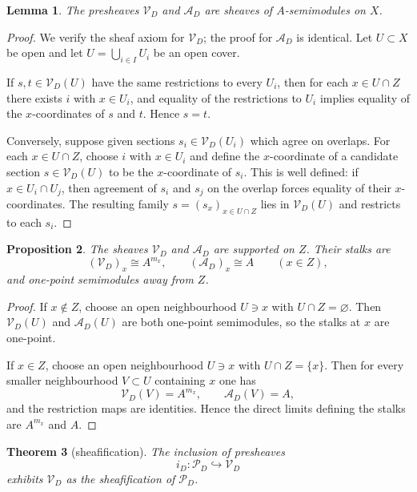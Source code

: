 \documentclass[11pt,a4paper]{article}
\newtheorem{theorem}{Theorem}[section]
\newtheorem{proposition}[theorem]{Proposition}
\newtheorem{lemma}[theorem]{Lemma}
\theoremstyle{definition}
\theoremstyle{remark}
\newcommand{\into}{\hookrightarrow}
\newcommand{\Vd}{\mathcal V_D}
\newcommand{\Ad}{\mathcal A_D}
\newcommand{\Pd}{\mathcal P_D}
\begin{document}
\begin{lemma}\label{lem:product-sheaf}
The presheaves $\Vd$ and $\Ad$ are sheaves of $A$-semimodules on $X$.
\end{lemma}

\begin{proof}
We verify the sheaf axiom for $\Vd$; the proof for $\Ad$ is identical. Let $U\subset X$ be open and let $U=\bigcup_{i\in I}U_i$ be an open cover.

If $s,t\in\Vd(U)$ have the same restrictions to every $U_i$, then for each $x\in U\cap Z$ there exists $i$ with $x\in U_i$, and equality of the restrictions to $U_i$ implies equality of the $x$-coordinates of $s$ and $t$. Hence $s=t$.

Conversely, suppose given sections $s_i\in\Vd(U_i)$ which agree on overlaps. For each $x\in U\cap Z$, choose $i$ with $x\in U_i$ and define the $x$-coordinate of a candidate section $s\in\Vd(U)$ to be the $x$-coordinate of $s_i$. This is well defined: if $x\in U_i\cap U_j$, then agreement of $s_i$ and $s_j$ on the overlap forces equality of their $x$-coordinates. The resulting family $s=(s_x)_{x\in U\cap Z}$ lies in $\Vd(U)$ and restricts to each $s_i$.
\end{proof}

\begin{proposition}\label{prop:stalks-VA}
The sheaves $\Vd$ and $\Ad$ are supported on $Z$. Their stalks are
\[
(\Vd)_x\cong A^{m_x},\qquad (\Ad)_x\cong A\qquad (x\in Z),
\]
and one-point semimodules away from $Z$.
\end{proposition}

\begin{proof}
If $x\notin Z$, choose an open neighbourhood $U\ni x$ with $U\cap Z=\varnothing$. Then $\Vd(U)$ and $\Ad(U)$ are both one-point semimodules, so the stalks at $x$ are one-point.

If $x\in Z$, choose an open neighbourhood $U\ni x$ with $U\cap Z=\{x\}$. Then for every smaller neighbourhood $V\subset U$ containing $x$ one has
\[
\Vd(V)=A^{m_x},\qquad \Ad(V)=A,
\]
and the restriction maps are identities. Hence the direct limits defining the stalks are $A^{m_x}$ and $A$.
\end{proof}

\begin{theorem}[sheafification]\label{thm:sheafification}
The inclusion of presheaves
\[
i_D:\Pd\into\Vd
\]
exhibits $\Vd$ as the sheafification of $\Pd$.
\end{theorem}
\end{document}

